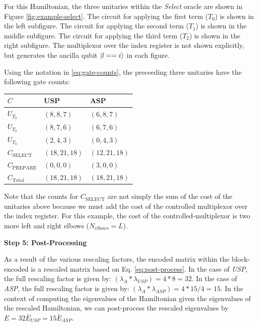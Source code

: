 For this Hamiltonian, the three unitaries within the \textit{Select} oracle are shown in Figure \ref{fig:example-select}.
The circuit for applying the first term ($T_0$) is shown in the left subfigure. 
The circuit for applying the second term ($T_1$) is shown in the middle subfigure. 
The circuit for applying the third term ($T_2$) is shown in the right subfigure. 
The multiplexor over the index register is not shown explicitly, but generates the ancilla qubit $\ket{l == i}$ in each figure.

Using the notation in \ref{eq:gate-counts}, the preceeding three unitaries have the following gate counts:

\begin{center}
    \begin{tabular}{ |p{2cm}||p{3cm}|p{3cm}|}
        \hline
        $C$& USP &ASP\\
        \hline
        $U_{T_0}$   & $(8, 8, 7)$    &$(6, 8, 7)$\\
        $U_{T_0}$   & $(8, 7, 6)$    &$(6, 7, 6)$\\
        $U_{T_0}$   & $(2, 4, 3)$    &$(0, 4, 3)$\\
        \hline
        $C_{\text{SELECT}}$ & $(18, 21, 18)$ &$(12, 21, 18)$\\
        $C_{\text{PREPARE}}$ & $(0, 0, 0)$ &$(3, 0, 0)$\\
        \hline
        $C_{\text{Total}}$ & $(18, 21, 18)$& $(18, 21, 18)$\\
        \hline
       \end{tabular}
\end{center}

Note that the counts for $C_{\text{SELECT}}$ are not simply the sum of the cost of the unitaries above because we must add the cost of the controlled multiplexor over the index register.
For this example, the cost of the controlled-multiplexor is two more left and right elbows ($N_{elbows} = L$). 

\textbf{Step 5: Post-Processing}

As a result of the various rescaling factors, the encoded matrix within the block-encoded is a rescaled matrix based on Eq. \ref{eq:post-process}.
In the case of \textit{USP}, the full rescaling factor is given by: $(\lambda_A * \lambda_{USP}) = 4*8 = 32$.
In the case of \textit{ASP}, the full rescaling factor is given by: $(\lambda_A * \lambda_{ASP}) = 4*15/4 = 15$.
In the context of computing the eigenvalues of the Hamiltonian given the eigenvalues of the rescaled Hamiltonian, we can post-process the rescaled eigenvalues by $E = 32 \bar{E}_{USP} = 15 \bar{E}_{ASP}$.
